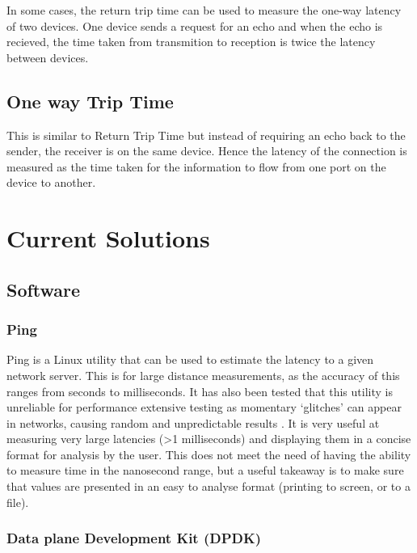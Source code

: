 In some cases, the return trip time can be used to measure the one-way latency of two devices. One
device sends a request for an echo and when the echo is recieved, the time taken from transmition to reception is
twice the latency between devices.

\subsection{One way Trip Time}

This is similar to Return Trip Time but instead of requiring an echo back to the sender, the receiver is on the
same device. Hence the latency of the connection is measured as the time taken for the information
to flow from one port on the device to another.

\section{Current Solutions}

\subsection{Software}

\subsubsection{Ping}

Ping is a Linux utility that can be used to estimate the latency to a given network server. 
This is for large distance measurements, as the accuracy of this ranges from seconds to milliseconds. 
It has also been tested that this utility is unreliable for performance extensive testing as momentary ‘glitches’ can appear in networks, causing random and unpredictable results \cite{pingisbad}.
It is very useful at measuring very large latencies (>1 milliseconds) and displaying them in a concise format for analysis by the user. 
This does not meet the need of having the ability to measure time in the nanosecond range, but a useful takeaway is to make sure that values are presented in an easy to analyse format (printing to screen, or to a file).

\subsubsection{Data plane Development Kit (DPDK)}


